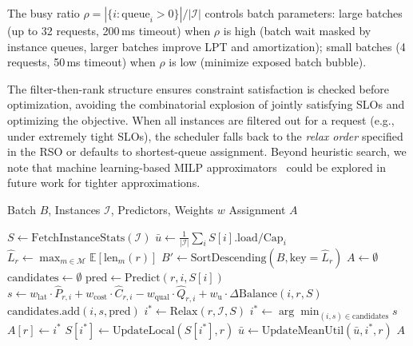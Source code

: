 \documentclass[letterpaper, anonymous, twocolumn, 10pt]{article}
\begin{document}
The busy ratio $\rho = |\{i : \text{queue}_i > 0\}| / |\mathcal{I}|$ controls batch parameters: large batches (up to 32 requests, 200\,ms timeout) when $\rho$ is high (batch wait masked by instance queues, larger batches improve LPT and amortization); small batches (4 requests, 50\,ms timeout) when $\rho$ is low (minimize exposed batch bubble).

The filter-then-rank structure ensures constraint satisfaction is checked before optimization, avoiding the combinatorial explosion of jointly satisfying SLOs and optimizing the objective.
When all instances are filtered out for a request (e.g., under extremely tight SLOs), the scheduler falls back to the \emph{relax order} specified in the RSO or defaults to shortest-queue assignment.
Beyond heuristic search, we note that machine learning-based MILP approximators~\cite{nair2021solvingmixedintegerprograms, lee2025rlsphlearningachievefeasible} could be explored in future work for tighter approximations.

\begin{algorithm}[t]
\caption{LPT-Based Greedy Scheduler}\label{alg:greedy}
\begin{algorithmic}[1]
\Require Batch $B$, Instances $\mathcal{I}$, Predictors, Weights $w$
\Ensure Assignment $A$

    \State $S \leftarrow \text{FetchInstanceStats}(\mathcal{I})$ 
    \State $\bar{u} \leftarrow \frac{1}{|\mathcal{I}|}\sum_{i} S[i].\text{load} / \text{Cap}_i$ 
     
        \State $\hat{L}_r \leftarrow \max_{m \in \mathcal{M}} \mathbb{E}[\text{len}_m(r)]$
    \EndFor
    \State $B' \leftarrow \text{SortDescending}(B, \text{key}=\hat{L}_r)$ 
    \State $A \leftarrow \emptyset$
        \State $\text{candidates} \leftarrow \emptyset$
            \State $\text{pred} \leftarrow \text{Predict}(r, i, S[i])$ 
                \State $s \leftarrow w_{\text{lat}} \cdot \hat{P}_{r,i} + w_{\text{cost}} \cdot \hat{C}_{r,i} - w_{\text{qual}} \cdot \hat{Q}_{r,i} + w_{\text{u}} \cdot \Delta\text{Balance}(i, r, S)$
                \State $\text{candidates}.\text{add}(i, s, \text{pred})$
            \EndIf
        \EndFor
            \State $i^* \leftarrow \text{Relax}(r, \mathcal{I}, S)$ 
        \Else
            \State $i^* \leftarrow \arg\min_{(i,s) \in \text{candidates}} s$
        \EndIf
        \State $A[r] \leftarrow i^*$
        \State $S[i^*] \leftarrow \text{UpdateLocal}(S[i^*], r)$ 
        \State $\bar{u} \leftarrow \text{UpdateMeanUtil}(\bar{u}, i^*, r)$ 
        \State {}
    \EndFor
    \State \Return $A$
\EndFunction
\end{algorithmic}
\end{algorithm}
\end{document}
